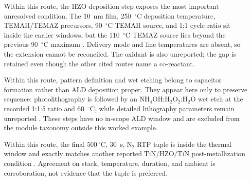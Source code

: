 \documentclass[11pt,a4paper]{report}
\begin{document}
Within this route, the HZO deposition step exposes the most important unresolved condition. The 10~nm film, 250~$^\circ$C deposition temperature, TEMAH/TEMAZ precursors, 90~$^\circ$C TEMAH source, and 1:1 cycle ratio sit inside the earlier windows, but the 110~$^\circ$C TEMAZ source lies beyond the previous 90~$^\circ$C maximum \cite{choi2025purge,kashir2021wake,tsai2022stress}. Delivery mode and line temperatures are absent, so the extension cannot be reconciled. The oxidant is also unreported; the gap is retained even though the other cited routes name a co-reactant.

Within this route, pattern definition and wet etching belong to capacitor formation rather than ALD deposition proper. They appear here only to preserve sequence: photolithography is followed by an NH$_4$OH:H$_2$O$_2$:H$_2$O wet etch at the recorded 1:1:5 ratio and 60~$^\circ$C, while detailed lithography parameters remain unreported \cite{tsai2022stress}. These steps have no in-scope ALD window and are excluded from the module taxonomy outside this worked example.

Within this route, the final $500\,^{\circ}$C, 30~s, N$_2$ RTP tuple is inside the thermal window and exactly matches another reported TiN/HZO/TiN post-metallization condition \cite{choi2022chamber,tsai2022stress}. Agreement on stack, temperature, duration, and ambient is corroboration, not evidence that the tuple is preferred.
\end{document}
